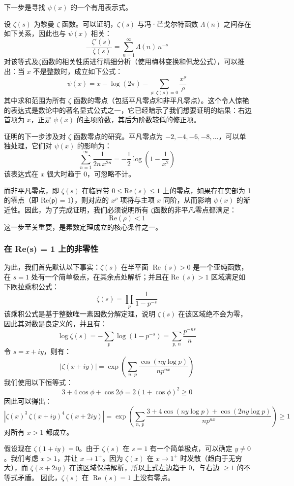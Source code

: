 下一步是寻找 $\psi(x)$ 的一个有用表示式。

设 $\zeta (s)$ 为黎曼 $\zeta$  函数。可以证明，$\zeta (s)$ 与冯·芒戈尔特函数 $\Lambda(n)$ 之间存在如下关系，因此也与 $\psi(x)$ 相关：
$$
- \frac{\zeta'(s)}{\zeta(s)} = \sum_{n=1}^{\infty} \Lambda(n)\, n^{-s}~
$$
对该等式及$\zeta$函数的相关性质进行精细分析（使用梅林变换和佩龙公式），可以推出：当 $x$ 不是整数时，成立如下公式：
$$
\psi(x) = x - \log(2\pi) - \sum_{\rho:\, \zeta(\rho) = 0} \frac{x^{\rho}}{\rho}~
$$
其中求和范围为所有 $\zeta$ 函数的零点（包括平凡零点和非平凡零点）。这个令人惊艳的表达式是数论中的著名显式公式之一，它已经暗示了我们想要证明的结果：右边首项为 $x$，正是 $\psi(x)$ 的主项阶数，其后为阶数较低的修正项。

证明的下一步涉及对 $\zeta$ 函数零点的研究。平凡零点为 $-2, -4, -6, -8, \dots$，可以单独处理，它们对 $\psi(x)$ 的影响为：
$$
\sum_{n=1}^{\infty} \frac{1}{2n\, x^{2n}} = -\frac{1}{2} \log\left(1 - \frac{1}{x^2}\right)~
$$
该表达式在 $x$ 很大时趋于 0，可忽略不计。

而非平凡零点，即 $\zeta (s)$ 在临界带 $0 \leq \text{Re}(s) \leq 1$ 上的零点，如果存在实部为 1 的零点（即 Re(ρ) = 1），则对应的 $x^\rho$ 项将与主项 $x$ 同阶，从而影响 $\psi(x)$ 的渐近性。因此，为了完成证明，我们必须说明所有 $\zeta$函数的非平凡零点都满足：
$$
\text{Re}(\rho) < 1~
$$
这一步至关重要，是素数定理成立的核心条件之一。
\subsubsection{在 Re(s) = 1 上的非零性}
为此，我们首先默认以下事实：$\zeta(s)$ 在半平面 $\operatorname{Re}(s) > 0$ 是一个亚纯函数，在 $s = 1$ 处有一个简单极点，在其余点处解析；并且在$\operatorname{Re}(s) > 1$ 区域满足如下欧拉乘积公式：
$$
\zeta(s) = \prod_p \frac{1}{1 - p^{-s}}~
$$
该乘积公式是基于整数唯一素因数分解定理，说明 $\zeta(s)$ 在该区域绝不会为零，因此其对数是良定义的，并且有：
$$
\log \zeta(s) = -\sum_p \log(1 - p^{-s}) = \sum_{p,\,n} \frac{p^{-n s}}{n}~
$$
令 $s = x + i y$，则有：
$$
|\zeta(x + i y)| = \exp\left( \sum_{n,\,p} \frac{\cos(n y \log p)}{n p^{n x}} \right)~
$$
我们使用以下恒等式：
$$
3 + 4 \cos \phi + \cos 2\phi = 2(1 + \cos \phi)^2 \geq 0~
$$
因此可以得出：
$$
\left| \zeta(x)^3 \, \zeta(x + i y)^4 \, \zeta(x + 2i y) \right| = \exp\left( \sum_{n,\,p} \frac{3 + 4\cos(n y \log p) + \cos(2n y \log p)}{n p^{n x}} \right) \geq 1~
$$
对所有 $x > 1$ 都成立。

假设现在 $\zeta(1 + i y) = 0$。由于 $\zeta(s)$ 在 $s = 1$ 有一个简单极点，可以确定 $y \neq 0$。我们考虑 $x > 1$，并让 $x \to 1^+$。因为 $\zeta(x)$ 在 $x \to 1^+$ 时发散（趋向于无穷大），而 $\zeta(x + 2i y)$ 在该区域保持解析，所以上式左边趋于 0，与右边 $\geq 1$ 的不等式矛盾。
因此，$\zeta(s)$ 在 $\operatorname{Re}(s) = 1$ 上没有零点。

